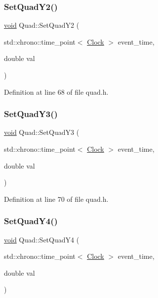 \subsubsection{\texorpdfstring{Set\+Quad\+Y2()}{SetQuadY2()}}
{\footnotesize\ttfamily \mbox{\hyperlink{glad_8h_a950fc91edb4504f62f1c577bf4727c29}{void}} Quad\+::\+Set\+Quad\+Y2 (\begin{DoxyParamCaption}\item[{std\+::chrono\+::time\+\_\+point$<$ \mbox{\hyperlink{universe_8h_a0ef8d951d1ca5ab3cfaf7ab4c7a6fd80}{Clock}} $>$}]{event\+\_\+time,  }\item[{double}]{val }\end{DoxyParamCaption})\hspace{0.3cm}{\ttfamily [inline]}}



Definition at line 68 of file quad.\+h.

\mbox{\label{class_quad_a1774a89a5d668aadf94966867270c0c5}} 
\subsubsection{\texorpdfstring{Set\+Quad\+Y3()}{SetQuadY3()}}
{\footnotesize\ttfamily \mbox{\hyperlink{glad_8h_a950fc91edb4504f62f1c577bf4727c29}{void}} Quad\+::\+Set\+Quad\+Y3 (\begin{DoxyParamCaption}\item[{std\+::chrono\+::time\+\_\+point$<$ \mbox{\hyperlink{universe_8h_a0ef8d951d1ca5ab3cfaf7ab4c7a6fd80}{Clock}} $>$}]{event\+\_\+time,  }\item[{double}]{val }\end{DoxyParamCaption})\hspace{0.3cm}{\ttfamily [inline]}}



Definition at line 70 of file quad.\+h.

\mbox{\label{class_quad_ae299f75dcd479f5eb6ba8efed578961b}} 
\subsubsection{\texorpdfstring{Set\+Quad\+Y4()}{SetQuadY4()}}
{\footnotesize\ttfamily \mbox{\hyperlink{glad_8h_a950fc91edb4504f62f1c577bf4727c29}{void}} Quad\+::\+Set\+Quad\+Y4 (\begin{DoxyParamCaption}\item[{std\+::chrono\+::time\+\_\+point$<$ \mbox{\hyperlink{universe_8h_a0ef8d951d1ca5ab3cfaf7ab4c7a6fd80}{Clock}} $>$}]{event\+\_\+time,  }\item[{double}]{val }\end{DoxyParamCaption})\hspace{0.3cm}{\ttfamily [inline]}}




